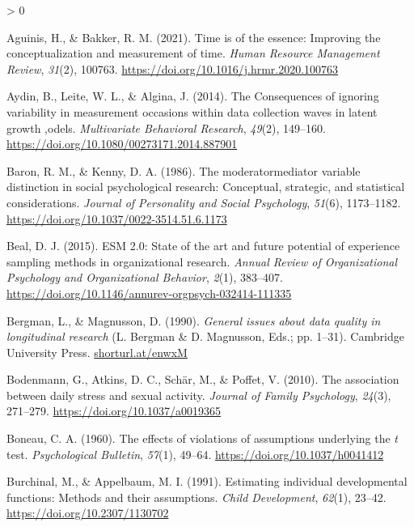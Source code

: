 \documentclass[
12pt, %
twoside,
english]{guelphthesis}
\newlength{\cslhangindent}
\newenvironment{CSLReferences}[2] %
 {%
  \setlength{\parindent}{0pt}
  \ifodd #1 \everypar{\setlength{\hangindent}{\cslhangindent}}\ignorespaces\fi
  \ifnum #2 > 0
  \setlength{\parskip}{\linespacing{2}}
  \fi
 }%
 {}
\begin{document}
\hypertarget{refs}{}
\begin{CSLReferences}{1}{0}
\leavevmode{}%
Aguinis, H., \& Bakker, R. M. (2021). Time is of the essence: Improving the conceptualization and measurement of time. \emph{Human Resource Management Review}, \emph{31}(2), 100763. \url{https://doi.org/10.1016/j.hrmr.2020.100763}

\leavevmode{}%
Aydin, B., Leite, W. L., \& Algina, J. (2014). The Consequences of ignoring variability in measurement occasions within data collection waves in latent growth ,odels. \emph{Multivariate Behavioral Research}, \emph{49}(2), 149--160. \url{https://doi.org/10.1080/00273171.2014.887901}

\leavevmode{}%
Baron, R. M., \& Kenny, D. A. (1986). The moderator{\textendash}mediator variable distinction in social psychological research: Conceptual, strategic, and statistical considerations. \emph{Journal of Personality and Social Psychology}, \emph{51}(6), 1173--1182. \url{https://doi.org/10.1037/0022-3514.51.6.1173}

\leavevmode{}%
Beal, D. J. (2015). ESM 2.0: State of the art and future potential of experience sampling methods in organizational research. \emph{Annual Review of Organizational Psychology and Organizational Behavior}, \emph{2}(1), 383--407. \url{https://doi.org/10.1146/annurev-orgpsych-032414-111335}

\leavevmode{}%
Bergman, L., \& Magnusson, D. (1990). \emph{General issues about data quality in longitudinal research} (L. Bergman \& D. Magnusson, Eds.; pp. 1--31). Cambridge University Press. \href{https://shorturl.at/enwxM}{shorturl.at/enwxM}

\leavevmode{}%
Bodenmann, G., Atkins, D. C., Schär, M., \& Poffet, V. (2010). The association between daily stress and sexual activity. \emph{Journal of Family Psychology}, \emph{24}(3), 271--279. \url{https://doi.org/10.1037/a0019365}

\leavevmode{}%
Boneau, C. A. (1960). The effects of violations of assumptions underlying the \emph{t} test. \emph{Psychological Bulletin}, \emph{57}(1), 49--64. \url{https://doi.org/10.1037/h0041412}

\leavevmode{}%
Burchinal, M., \& Appelbaum, M. I. (1991). Estimating individual developmental functions: Methods and their assumptions. \emph{Child Development}, \emph{62}(1), 23--42. \url{https://doi.org/10.2307/1130702}


\end{CSLReferences}
\end{document}
